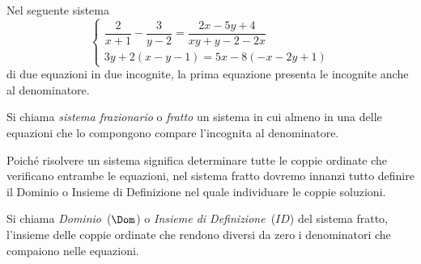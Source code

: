 Nel seguente sistema
\[\left\{\begin{array}{l}\dfrac{2}{x+1}-\dfrac{3}{y-2}=\dfrac{2x-5y+4}{xy+y-2-2x}\\3y+2(x-y-1)=5x-8(-x-2y+1)\end{array}\right.\]
di due equazioni in due incognite, la prima equazione presenta le
incognite anche al denominatore.

\begin{definizione}
Si chiama \emph{sistema frazionario} o \emph{fratto} un sistema in cui almeno in una delle equazioni che lo
compongono compare l'incognita al denominatore.
\end{definizione}

Poiché risolvere un sistema significa determinare tutte le coppie
ordinate che verificano entrambe le equazioni, nel sistema fratto
dovremo innanzi tutto definire il Dominio o Insieme di Definizione nel
quale individuare le coppie soluzioni.

\begin{definizione}
Si chiama \emph{Dominio}~($\Dom$) o \emph{Insieme di Definizione}~($ID$) del sistema fratto,
l'insieme delle coppie ordinate che rendono diversi da zero i denominatori che
compaiono nelle equazioni.
\end{definizione}

